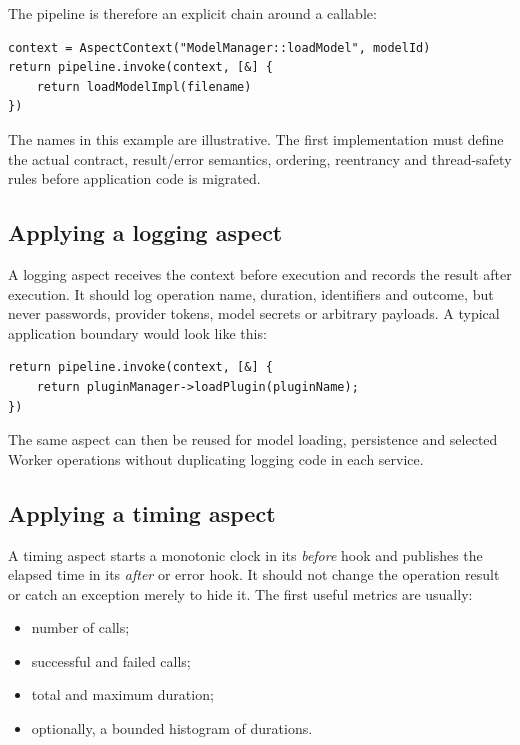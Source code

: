 The pipeline is therefore an explicit chain around a callable:

\begin{verbatim}
context = AspectContext("ModelManager::loadModel", modelId)
return pipeline.invoke(context, [&] {
    return loadModelImpl(filename)
})
\end{verbatim}

The names in this example are illustrative. The first implementation must
define the actual contract, result/error semantics, ordering, reentrancy and
thread-safety rules before application code is migrated.

\subsection{Applying a logging aspect}

A logging aspect receives the context before execution and records the result
after execution. It should log operation name, duration, identifiers and
outcome, but never passwords, provider tokens, model secrets or arbitrary
payloads. A typical application boundary would look like this:

\begin{verbatim}
return pipeline.invoke(context, [&] {
    return pluginManager->loadPlugin(pluginName);
})
\end{verbatim}

The same aspect can then be reused for model loading, persistence and selected
Worker operations without duplicating logging code in each service.

\subsection{Applying a timing aspect}

A timing aspect starts a monotonic clock in its \textit{before} hook and
publishes the elapsed time in its \textit{after} or error hook. It should not
change the operation result or catch an exception merely to hide it. The
first useful metrics are usually:

\begin{itemize}
 \item number of calls;
 \item successful and failed calls;
 \item total and maximum duration;
 \item optionally, a bounded histogram of durations.
\end{itemize}

